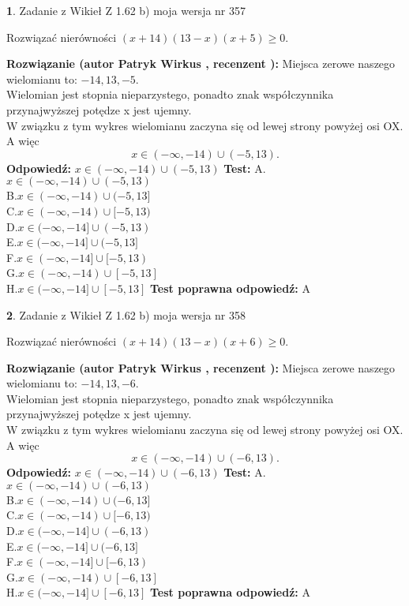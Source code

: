 \documentclass[12pt, a4paper]{article}
\theoremstyle{definition} %
\newtheorem{zad}{}
\newcommand{\zadStart}[1]{\begin{zad}#1\newline}
\newcommand{\zadStop}{\end{zad}}
\newcommand{\rozwStart}[2]{\noindent \textbf{Rozwiązanie (autor #1 , recenzent #2): }\newline}
\newcommand{\rozwStop}{\newline}
\newcommand{\odpStart}{\noindent \textbf{Odpowiedź:}\newline}
\newcommand{\odpStop}{\newline}
\newcommand{\testStart}{\noindent \textbf{Test:}\newline}
\newcommand{\testStop}{\newline}
\newcommand{\kluczStart}{\noindent \textbf{Test poprawna odpowiedź:}\newline}
\newcommand{\kluczStop}{\newline}
\begin{document}
\zadStart{Zadanie z Wikieł Z 1.62 b) moja wersja nr 357}

Rozwiązać nierówności $(x+14)(13-x)(x+5)\ge0$.
\zadStop
\rozwStart{Patryk Wirkus}{}
Miejsca zerowe naszego wielomianu to: $-14, 13, -5$.\\
Wielomian jest stopnia nieparzystego, ponadto znak współczynnika przy\linebreak najwyższej potędze x jest ujemny.\\ W związku z tym wykres wielomianu zaczyna się od lewej strony powyżej osi OX. A więc $$x \in (-\infty,-14) \cup (-5,13).$$
\rozwStop
\odpStart
$x \in (-\infty,-14) \cup (-5,13)$
\odpStop
\testStart
A.$x \in (-\infty,-14) \cup (-5,13)$\\
B.$x \in (-\infty,-14) \cup (-5,13]$\\
C.$x \in (-\infty,-14) \cup [-5,13)$\\
D.$x \in (-\infty,-14] \cup (-5,13)$\\
E.$x \in (-\infty,-14] \cup (-5,13]$\\
F.$x \in (-\infty,-14] \cup [-5,13)$\\
G.$x \in (-\infty,-14) \cup [-5,13]$\\
H.$x \in (-\infty,-14] \cup [-5,13]$
\testStop
\kluczStart
A
\kluczStop



\zadStart{Zadanie z Wikieł Z 1.62 b) moja wersja nr 358}

Rozwiązać nierówności $(x+14)(13-x)(x+6)\ge0$.
\zadStop
\rozwStart{Patryk Wirkus}{}
Miejsca zerowe naszego wielomianu to: $-14, 13, -6$.\\
Wielomian jest stopnia nieparzystego, ponadto znak współczynnika przy\linebreak najwyższej potędze x jest ujemny.\\ W związku z tym wykres wielomianu zaczyna się od lewej strony powyżej osi OX. A więc $$x \in (-\infty,-14) \cup (-6,13).$$
\rozwStop
\odpStart
$x \in (-\infty,-14) \cup (-6,13)$
\odpStop
\testStart
A.$x \in (-\infty,-14) \cup (-6,13)$\\
B.$x \in (-\infty,-14) \cup (-6,13]$\\
C.$x \in (-\infty,-14) \cup [-6,13)$\\
D.$x \in (-\infty,-14] \cup (-6,13)$\\
E.$x \in (-\infty,-14] \cup (-6,13]$\\
F.$x \in (-\infty,-14] \cup [-6,13)$\\
G.$x \in (-\infty,-14) \cup [-6,13]$\\
H.$x \in (-\infty,-14] \cup [-6,13]$
\testStop
\kluczStart
A
\kluczStop
\end{document}
